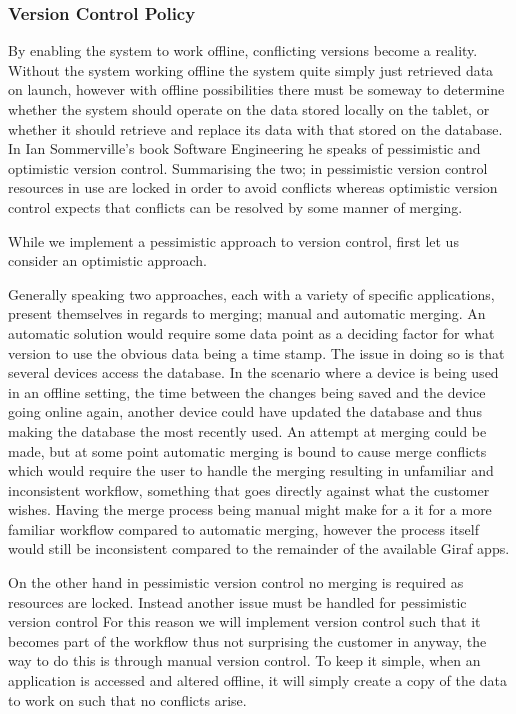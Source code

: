 \subsubsection*{Version Control Policy}
By enabling the system to work offline, conflicting versions become a reality.
Without the system working offline the system quite simply just retrieved data on launch, however with offline possibilities there must be someway to determine whether the system should operate on the data stored locally on the tablet, or whether it should retrieve and replace its data with that stored on the database.
In Ian Sommerville's book Software Engineering \citep{SEBOOK} he speaks of pessimistic and optimistic version control.
Summarising the two; in pessimistic version control resources in use are locked in order to avoid conflicts whereas optimistic version control expects that conflicts can be resolved by some manner of merging.

While we implement a pessimistic approach to version control, first let us consider an optimistic approach.

Generally speaking two approaches, each with a variety of specific applications, present themselves in regards to merging; manual and automatic merging.
An automatic solution would require some data point as a deciding factor for what version to use the obvious data being a time stamp.
The issue in doing so is that several devices access the database.
In the scenario where a device is being used in an offline setting, the time between the changes being saved and the device going online again, another device could have updated the database and thus making the database the most recently used.
An attempt at merging could be made, but at some point automatic merging is bound to cause merge conflicts which would require the user to handle the merging resulting in unfamiliar and inconsistent workflow, something that goes directly against what the customer wishes.
Having the merge process being manual might make for a it for a more familiar workflow compared to automatic merging, however the process itself would still be inconsistent compared to the remainder of the available Giraf apps.

On the other hand in pessimistic version control no merging is required as resources are locked.
Instead another issue must be handled for pessimistic version control
For this reason we will implement version control such that it becomes part of the workflow thus not surprising the customer in anyway, the way to do this is through manual version control.
To keep it simple, when an application is accessed and altered offline, it will simply create a copy of the data to work on such that no conflicts arise. 